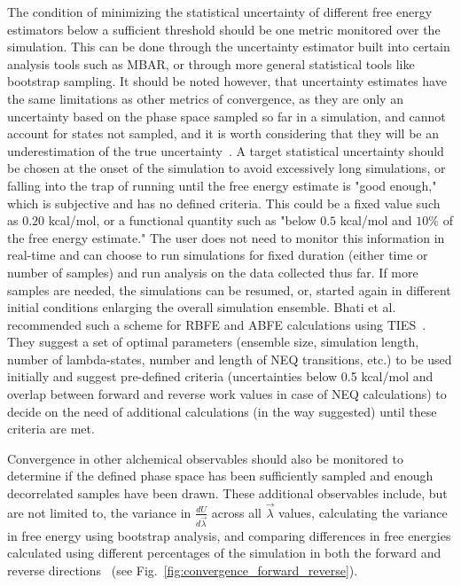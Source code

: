 \documentclass[9pt,bestpractices]{livecoms}
\begin{document}
The condition of minimizing the statistical uncertainty of different free energy estimators below a sufficient threshold should be one metric monitored over the simulation. This can be done through the uncertainty estimator built into certain analysis tools such as MBAR, or through more general statistical tools like bootstrap sampling. It should be noted however, that uncertainty estimates have the same limitations as other metrics of convergence, as they are only an uncertainty based on the phase space sampled so far in a simulation, and cannot account for states not sampled, and it is worth considering that they will be an underestimation of the true uncertainty~\cite{wan2020fep+, wan2021uq, vassaux2021, gapsys2020large, wade2022, bhati2017, bhati2022, bhati2025, wan2023eqvsneq, bhati2018, bhati2019, cournia2017relative, gapsys2021accurate, baumann2021challenges, caves1998locally}.
A target statistical uncertainty should be chosen at the onset of the simulation to avoid excessively long simulations, or falling into the trap of running until the free energy estimate is "good enough," which is subjective and has no defined criteria. This could be a fixed value such as $0.20$ kcal/mol, or a functional quantity such as "below $0.5$ kcal/mol and $10\%$ of the free energy estimate." The user does not need to monitor this information in real-time and can choose to run simulations for fixed duration (either time or number of samples) and run analysis on the data collected thus far. If more samples are needed, the simulations can be resumed, or, started again in different initial conditions enlarging the overall simulation ensemble. 
Bhati et al. recommended such a scheme for RBFE and ABFE calculations using TIES~\cite{bhati2022, bhati2025, wan2023eqvsneq, coveney2022corners}. They suggest a set of optimal parameters (ensemble size, simulation length, number of lambda-states, number and length of NEQ transitions, etc.) to be used initially and suggest pre-defined criteria (uncertainties below 0.5 kcal/mol and overlap between forward and reverse work values in case of NEQ calculations) to decide on the need of additional calculations (in the way suggested) until these criteria are met.

Convergence in other alchemical observables should also be monitored to determine if the defined phase space has been sufficiently sampled and enough decorrelated samples have been drawn. These additional observables include, but are not limited to, the variance in $\frac{dU}{d\vec{\lambda}}$ across all $\vec{\lambda}$ values, calculating the variance in free energy using bootstrap analysis, and comparing differences in free energies calculated using different percentages of the simulation in both the forward and reverse directions~\cite{klimovich2015guidelines} (see Fig.~\ref{fig:convergence_forward_reverse}).
\end{document}
